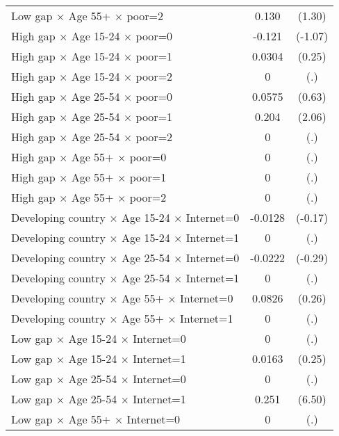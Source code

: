 {\begin{longtable}{l*{1}{cc}}
Low gap $\times$ Age 55+ $\times$ poor=2&       0.130         &      (1.30)\\
High gap $\times$ Age 15-24 $\times$ poor=0&      -0.121         &     (-1.07)\\
High gap $\times$ Age 15-24 $\times$ poor=1&      0.0304         &      (0.25)\\
High gap $\times$ Age 15-24 $\times$ poor=2&           0         &         (.)\\
High gap $\times$ Age 25-54 $\times$ poor=0&      0.0575         &      (0.63)\\
High gap $\times$ Age 25-54 $\times$ poor=1&       0.204\sym{*}  &      (2.06)\\
High gap $\times$ Age 25-54 $\times$ poor=2&           0         &         (.)\\
High gap $\times$ Age 55+ $\times$ poor=0&           0         &         (.)\\
High gap $\times$ Age 55+ $\times$ poor=1&           0         &         (.)\\
High gap $\times$ Age 55+ $\times$ poor=2&           0         &         (.)\\
Developing country $\times$ Age 15-24 $\times$ Internet=0&     -0.0128         &     (-0.17)\\
Developing country $\times$ Age 15-24 $\times$ Internet=1&           0         &         (.)\\
Developing country $\times$ Age 25-54 $\times$ Internet=0&     -0.0222         &     (-0.29)\\
Developing country $\times$ Age 25-54 $\times$ Internet=1&           0         &         (.)\\
Developing country $\times$ Age 55+ $\times$ Internet=0&      0.0826         &      (0.26)\\
Developing country $\times$ Age 55+ $\times$ Internet=1&           0         &         (.)\\
Low gap $\times$ Age 15-24 $\times$ Internet=0&           0         &         (.)\\
Low gap $\times$ Age 15-24 $\times$ Internet=1&      0.0163         &      (0.25)\\
Low gap $\times$ Age 25-54 $\times$ Internet=0&           0         &         (.)\\
Low gap $\times$ Age 25-54 $\times$ Internet=1&       0.251\sym{***}&      (6.50)\\
Low gap $\times$ Age 55+ $\times$ Internet=0&           0         &         (.)\\

\end{longtable}}
